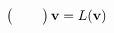 \documentclass[preview]{standalone}
\begin{document}
\begin{align*}
\begin{pmatrix} \hphantom{u_x} \hphantom{u_y} \end{pmatrix} \mathbf{v} = L ( \mathbf{v} )
\end{align*}
\end{document}
